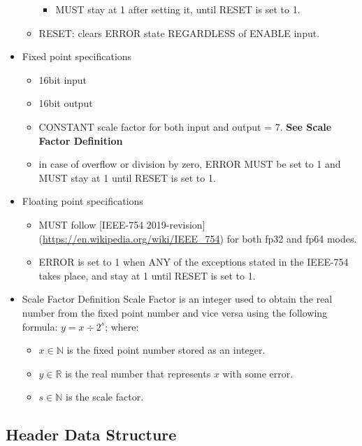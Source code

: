 \documentclass[12pt]{extarticle}
\begin{document}
\begin{itemize}
\begin{itemize}
\begin{itemize}
            \item MUST stay at 1 after setting it, until RESET is set to 1.
        \end{itemize}
        \item RESET: clears ERROR state REGARDLESS of ENABLE input.
    \end{itemize}
    \item Fixed point specifications
    \begin{itemize}
        \item 16bit input
        \item 16bit output
        \item CONSTANT scale factor for both input and output = 7. \textbf{See Scale Factor Definition}
        \item in case of overflow or division by zero, ERROR MUST be set to 1 and MUST stay at 1 until RESET is set to 1.
    \end{itemize}
    \item Floating point specifications
    \begin{itemize}
        \item MUST follow [IEEE-754 2019-revision] (\url{https://en.wikipedia.org/wiki/IEEE_754}) for both fp32 and fp64 modes.
        \item ERROR is set to 1 when ANY of the exceptions stated in the IEEE-754 takes place, and stay at 1 until RESET is set to 1.
    \end{itemize}
    \item Scale Factor Definition
    Scale Factor is an integer used to obtain the real number from the fixed point number and vice versa using the following formula: 
    $y = x \div 2^s$; where: 
    \begin{itemize}
        \item $x \in \mathbb{N}$ is the fixed point number stored as an integer.
        \item $y \in \mathbb{R}$ is the real number that represents $x$ with some error.
        \item $s \in \mathbb{N}$ is the scale factor.
    \end{itemize}
\end{itemize}

\subsection{Header Data Structure}
\end{document}
